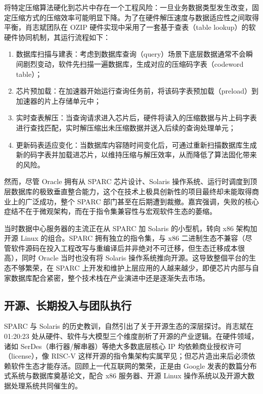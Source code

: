 \documentclass[UTF8,a4paper,11pt,fontset=fandol]{ctexart}
\begin{document}
将特定压缩算法硬化到芯片中存在一个工程风险：一旦业务数据类型发生改变，固定压缩方式的压缩效率可能明显下降。为了在硬件解压速度与数据适应性之间取得平衡，肖志斌团队在 OZIP 硬件实现中采用了一套基于查表（table lookup）的软硬件协同机制，其运行流程如下：
\begin{enumerate}
\item 数据库扫描与建表：考虑到数据库查询（query）场景下底层数据通常不会瞬间剧烈变动，软件先扫描一遍数据库，生成对应的压缩码字表（codeword table）；
\item 芯片预加载：在加速器开始运行查询任务前，将该码字表预加载（preload）到加速器的片上存储单元中；
\item 实时查表解压：当查询请求进入芯片后，硬件将读入的压缩数据与片上码字表进行查找匹配，实时解压缩出未压缩数据并送入后续的查询处理单元；
\item 更新码表适应变化：当数据库内容随时间变化后，可通过重新扫描数据库生成新的码字表并加载进芯片，以维持压缩与解压效率，从而降低了算法固化带来的风险。
\end{enumerate}

然而，尽管 Oracle 拥有从 SPARC 芯片设计、Solaris 操作系统、运行时调度到顶层数据库的极致垂直整合能力，这个在技术上极具创新性的项目最终却未能取得商业上的广泛成功，整个 SPARC 部门甚至在后期遭到裁撤。嘉宾强调，失败的核心症结不在于微观架构，而在于指令集兼容性与宏观软件生态的萎缩。

当时数据中心服务器的主流正在从 SPARC 加 Solaris 的小型机，转向 x86 架构加开源 Linux 的组合。SPARC 拥有独立的指令集，与 x86 二进制生态不兼容（尽管软件源码在投入工程改写与重编译后并非绝对不可迁移，但生态迁移成本很高），同时 Oracle 当时也没有将 Solaris 操作系统推向开源。这导致整個平台的生态不够繁荣，在 SPARC 上开发和维护上层应用的人越来越少，即便芯片内部与自家数据库配合紧密，整个技术栈在产业演进中还是逐渐失去市场。

\subsection{开源、长期投入与团队执行}
SPARC 与 Solaris 的历史教训，自然引出了关于开源生态的深层探讨。肖志斌在 01:20:23 处从硬件、软件与大模型三个维度剖析了开源的产业逻辑。在硬件领域，诸如 SerDes（串行器/解串器）等绝大多数底层核心 IP 均依赖商业授权许可（license），像 RISC-V 这样开源的指令集架构实属罕见；但芯片造出来后必须依赖软件生态才能存活。回顾上一代互联网的繁荣，正是由 Google 发表的数篇分布式系统与数据库奠基论文，配合 x86 服务器、开源 Linux 操作系统以及开源大数据处理系统共同催生的。
\end{document}
